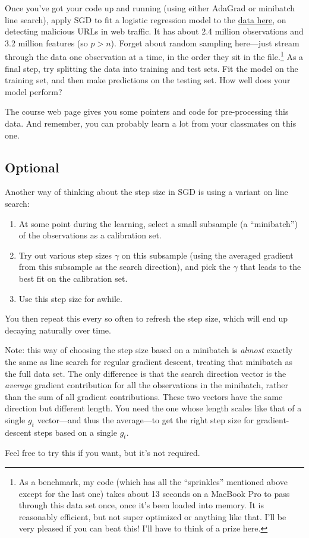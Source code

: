 \documentclass{mynotes}
\begin{document}
Once you've got your code up and running (using either AdaGrad or minibatch line search), apply SGD to fit a logistic regression model to the \href{http://archive.ics.uci.edu/ml/datasets/URL+Reputation}{data here}, on detecting malicious URLs in web traffic.  It has about 2.4 million observations and 3.2 million features (so $p > n$).   Forget about random sampling here---just stream through the data one observation at a time, in the order they sit in the file.\footnote{As a benchmark, my code (which has all the ``sprinkles'' mentioned above except for the last one) takes about 13 seconds on a MacBook Pro to pass through this data set once, once it's been loaded into memory.  It is reasonably efficient, but not super optimized or anything like that.   I'll be very pleased if you can beat this!  I'll have to think of a prize here.}  As a final step, try splitting the data into training and test sets.  Fit the model on the training set, and then make predictions on the testing set.  How well does your model perform?

The course web page gives you some pointers and code for pre-processing this data.  And remember, you can probably learn a lot from your classmates on this one.


\subsection{Optional}


Another way of thinking about the step size in SGD is using a variant on line search:
\begin{enumerate}[1.]
\item At some point during the learning, select a small subsample (a ``minibatch'') of the observations as a calibration set.
\item Try out various step sizes $\gamma$ on this subsample (using the averaged gradient from this subsample as the search direction), and pick the $\gamma$ that leads to the best fit on the calibration set.
\item Use this step size for awhile.
\end{enumerate}
You then repeat this every so often to refresh the step size, which will end up decaying naturally over time.

Note: this way of choosing the step size based on a minibatch is \textit{almost} exactly the same as line search for regular gradient descent, treating that minibatch as the full data set.  The only difference is that the search direction vector is the \textit{average} gradient contribution for all the observations in the minibatch, rather than the sum of all gradient contributions.  These two vectors have the same direction but different length.  You need the one whose length scales like that of a single $g_t$ vector---and thus the average---to get the right step size for gradient-descent steps based on a single $g_t$.

Feel free to try this if you want, but it's not required.
\end{document}
